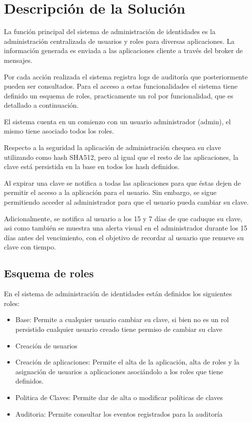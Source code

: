 \section{Descripción de la Solución}

La función principal del sistema de administración de identidades es la administración centralizada de usuarios y roles para diversas aplicaciones. La información generada es enviada a las aplicaciones cliente a través del broker de mensajes.

Por cada acción realizada el sistema registra logs de auditoría que posteriormente pueden ser consultados.
Para el acceso a estas funcionalidades el sistema tiene definido un esquema de roles, practicamente un rol por funcionalidad, que es detallado a continuación. 

El sistema cuenta en un comienzo con un usuario administrador (admin), el mismo tiene asociado todos los roles.

Respecto a la seguridad la aplicación de administración chequea su clave utilizando como hash SHA512, pero al igual que el resto de las aplicaciones, la clave está persistida en la base en todos los hash definidos.

Al expirar una clave se notifica a todas las aplicaciones para que éstas dejen de permitir el acceso a la aplicación
para el usuario. Sin embargo, se sigue permitiendo acceder al administrador para que el usuario pueda cambiar
su clave.

Adicionalmente, se notifica al usuario a los 15 y 7 días de que caduque su clave, asi como también se muestra
una alerta visual en el administrador durante los 15 días antes del vencimiento, con el objetivo de recordar
al usuario que renueve su clave con tiempo.

\subsection{Esquema de roles}

En el sistema de administración de identidades están definidos los siguientes roles:

\begin{itemize}
\item Base: Permite a cualquier usuario cambiar su clave, si bien no es un rol persistido cualquier usuario creado tiene permiso de cambiar su clave
\item Creación de usuarios
\item Creación de aplicaciones: Permite el alta de la aplicación, alta de roles y la asignación de usuarios a aplicaciones asociándolo a los roles que tiene definidos.	
\item Politica de Claves: Permite dar de alta o modificar políticas de claves
\item Auditoria: Permite consultar los eventos registrados para la auditoría
\end{itemize}

